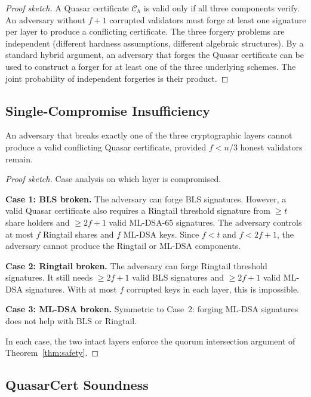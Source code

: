 \begin{proof}[Proof sketch]
A Quasar certificate $\mathcal{C}_h$ is valid only if all three components
verify. An adversary without $f+1$ corrupted validators must forge at least
one signature per layer to produce a conflicting certificate. The three
forgery problems are independent (different hardness assumptions, different
algebraic structures). By a standard hybrid argument, an adversary that
forges the Quasar certificate can be used to construct a forger for at least
one of the three underlying schemes. The joint probability of independent
forgeries is their product.
\end{proof}

\subsection{Single-Compromise Insufficiency}

\begin{theorem}
\label{thm:single}
An adversary that breaks exactly one of the three cryptographic layers
cannot produce a valid conflicting Quasar certificate, provided $f < n/3$
honest validators remain.
\end{theorem}

\begin{proof}[Proof sketch]
Case analysis on which layer is compromised.

\textbf{Case 1: BLS broken.} The adversary can forge BLS signatures. However,
a valid Quasar certificate also requires a Ringtail threshold signature from
$\geq t$ share holders and $\geq 2f+1$ valid ML-DSA-65 signatures. The
adversary controls at most $f$ Ringtail shares and $f$ ML-DSA keys.
Since $f < t$ and $f < 2f+1$, the adversary cannot produce the Ringtail
or ML-DSA components.

\textbf{Case 2: Ringtail broken.} The adversary can forge Ringtail threshold
signatures. It still needs $\geq 2f+1$ valid BLS signatures and $\geq 2f+1$
valid ML-DSA signatures. With at most $f$ corrupted keys in each layer,
this is impossible.

\textbf{Case 3: ML-DSA broken.} Symmetric to Case~2: forging ML-DSA
signatures does not help with BLS or Ringtail.

In each case, the two intact layers enforce the quorum intersection argument
of Theorem~\ref{thm:safety}.
\end{proof}


\subsection{QuasarCert Soundness}

